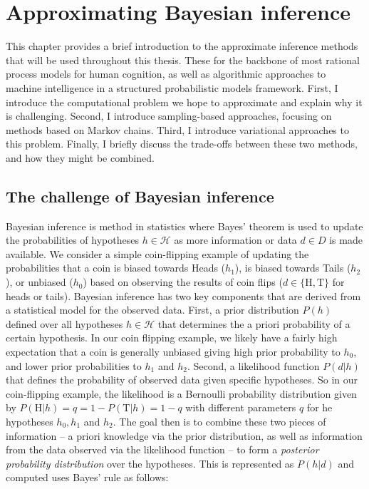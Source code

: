 
\chapter{Approximating Bayesian inference}
\label{chap:approx}

This chapter provides a brief introduction to the approximate inference methods that will be used throughout this thesis. These for the backbone of most rational process models for human cognition, as well as algorithmic approaches to machine intelligence in a structured probabilistic models framework. First, I introduce the computational problem we hope to approximate and explain why it is challenging. Second, I introduce sampling-based approaches, focusing on methods based on Markov chains. Third, I introduce variational approaches to this problem. Finally, I briefly discuss the trade-offs between these two methods, and how they might be combined.

\section{The challenge of Bayesian inference}
Bayesian inference is method in statistics where Bayes' theorem is used to update the probabilities of hypotheses $h \in \mathcal{H}$ as more information or data $d \in D$ is made available. We consider a simple coin-flipping example of updating the probabilities that a coin is biased towards Heads ($h_1$), is biased towards Tails ($h_2$), or unbiased ($h_0$) based on observing the results of coin flips ($d \in \{\text{H}, \text{T}\}$ for heads or tails). Bayesian inference has two key components that are derived from a statistical model for the observed data. First, a prior distribution $P(h)$ defined over all hypotheses $h \in \mathcal{H}$ that determines the a priori probability of a certain hypothesis. In our coin flipping example, we likely have a fairly high expectation that a coin is generally unbiased giving high prior probability to $h_0$, and lower prior probabilities to $h_1$ and $h_2$. Second, a likelihood function $P(d | h)$ that defines the probability of observed data given specific hypotheses. So in our coin-flipping example, the likelihood is a Bernoulli probability distribution given by $P(\text{H} | h) = q = 1 - P(\text{T} | h) = 1- q$ with different parameters $q$ for he hypotheses $h_0, h_1$ and $h_2$. The goal then is to combine these two pieces of information -- a priori knowledge via the prior distribution, as well as information from the data observed via the likelihood function -- to form a \textit{posterior probability distribution} over the hypotheses. This is represented as $P(h | d)$ and computed uses Bayes' rule as follows:

